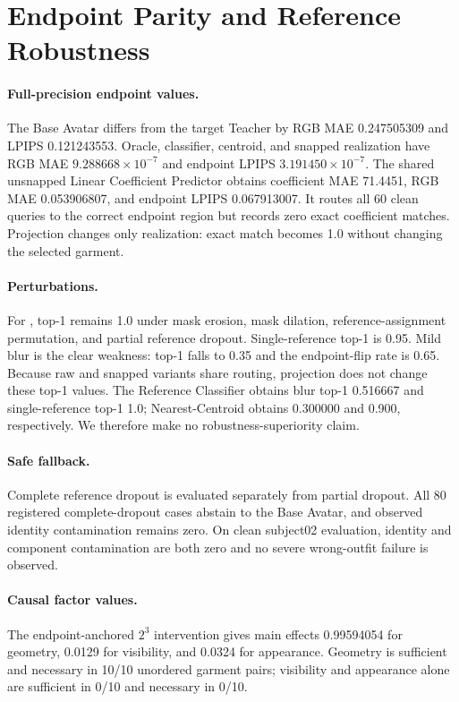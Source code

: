 \section{Endpoint Parity and Reference Robustness}
\label{sec:supp_endpoint_robustness}

\paragraph{Full-precision endpoint values.}
The Base Avatar differs from the target Teacher by RGB MAE 0.247505309 and LPIPS 0.121243553. Oracle, classifier, centroid, and snapped \method{} realization have RGB MAE $9.288668\times10^{-7}$ and endpoint LPIPS $3.191450\times10^{-7}$. The shared unsnapped Linear Coefficient Predictor obtains coefficient MAE 71.4451, RGB MAE 0.053906807, and endpoint LPIPS 0.067913007. It routes all 60 clean queries to the correct endpoint region but records zero exact coefficient matches. Projection changes only realization: exact match becomes 1.0 without changing the selected garment.

\paragraph{Perturbations.}
For \method{}, top-1 remains 1.0 under mask erosion, mask dilation, reference-assignment permutation, and partial reference dropout. Single-reference top-1 is 0.95. Mild blur is the clear weakness: top-1 falls to 0.35 and the endpoint-flip rate is 0.65. Because raw and snapped variants share routing, projection does not change these top-1 values. The Reference Classifier obtains blur top-1 0.516667 and single-reference top-1 1.0; Nearest-Centroid obtains 0.300000 and 0.900, respectively. We therefore make no robustness-superiority claim.

\paragraph{Safe fallback.}
Complete reference dropout is evaluated separately from partial dropout. All 80 registered complete-dropout cases abstain to the Base Avatar, and observed identity contamination remains zero. On clean subject02 evaluation, identity and component contamination are both zero and no severe wrong-outfit failure is observed.

\paragraph{Causal factor values.}
The endpoint-anchored $2^3$ intervention gives main effects 0.99594054 for geometry, 0.0129 for visibility, and 0.0324 for appearance. Geometry is sufficient and necessary in 10/10 unordered garment pairs; visibility and appearance alone are sufficient in 0/10 and necessary in 0/10.

